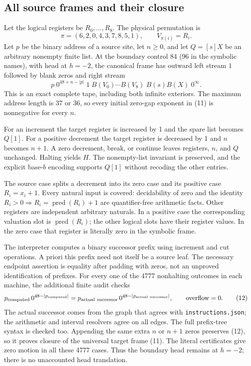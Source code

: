 \subsection{All source frames and their closure}

Let the logical registers be $R_0,\ldots,R_8$.  The physical permutation
is
\[
 \pi=(6,2,0,4,3,7,8,5,1),\qquad V_{\pi(i)}=R_i.                 \tag{10}
\]
Let $p$ be the binary address of a source site, let $n\geq0$, and let
$Q=[s]X$ be an arbitrary nonempty finite list.  At the boundary control
84 (96 in the symbolic names), with head at $h=-2$, the canonical frame
has outward left stream $1$ followed by blank zeros and right stream
\[
 p\;0^{48+n-|p|}\;1\;
 B(V_0)\cdots B(V_8)\; B(s)B(X)\;0^\infty.                     \tag{11}
\]
This is an exact complete tape, including both infinite exteriors.
The maximum address length is 37 or 36, so every initial zero-gap
exponent in (11) is nonnegative for every $n$.

For an increment the target register is increased by 1 and the spare
list becomes $Q[1]$.  For a positive decrement the target register is
decreased by 1 and $n$ becomes $n+1$.  A zero decrement, break, or
continue leaves registers, $n$, and $Q$ unchanged.  Halting yields $H$.
The nonempty-list invariant is preserved, and the explicit base-$b$
encoding supports $Q[1]$ without recoding the other entries.

The source case splits a decrement into its zero case and its positive
case $R_i=x_i+1$.  Every natural input is covered: decidability of zero
and the identity $R_i>0\Rightarrow R_i=\operatorname{pred}(R_i)+1$
are quantifier-free arithmetic facts.  Other registers are independent
arbitrary naturals.  In a positive case the corresponding valuation
slot is $\operatorname{pred}(R_i)$; the other logical slots have their
register values.  In the zero case that register is literally zero in
the symbolic frame.

The interpreter computes a binary successor prefix using increment
and cut operations.  A priori this prefix need not itself be a source
leaf.  The necessary endpoint assertion is equality after padding with
zeros, not an unproved identification of prefixes.  For every one of
the 4777 nonhalting outcomes in each machine, the additional finite audit
checks
\[
 p_{\rm computed}\,0^{48-|p_{\rm computed}|}
  =p_{\rm actual\ successor}\,0^{48-|p_{\rm actual\ successor}|},
 \qquad \mathrm{overflow}=0.                                    \tag{12}
\]
The actual successor comes from the graph that agrees with
\texttt{instructions.json}; the arithmetic and interval resolvers agree
on all edges.  The full prefix-tree syntax is checked too.  Appending
the same extra $n$ or $n+1$ zeros preserves (12), so it proves closure
of the universal target frame (11).  The literal certificates give zero
motion in all these 4777 cases.  Thus the boundary head remains at
$h=-2$; there is no unaccounted head translation.

